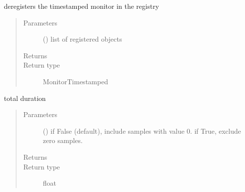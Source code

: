 \documentclass[letterpaper,10pt,english]{sphinxmanual}
\begin{document}
\begin{fulllineitems}
\begin{fulllineitems}
\end{fulllineitems}


\begin{fulllineitems}
\label{\detokenize{Reference:salabim.MonitorTimestamp.deregister}}
deregisters the timestamped monitor in the registry
\begin{quote}\begin{description}
\item[{Parameters}] \leavevmode
{} () \textendash{} list of registered objects

\item[{Returns}] \leavevmode
{}

\item[{Return type}] \leavevmode
MonitorTimestamped

\end{description}\end{quote}

\end{fulllineitems}


\begin{fulllineitems}
\label{\detokenize{Reference:salabim.MonitorTimestamp.duration}}
total duration
\begin{quote}\begin{description}
\item[{Parameters}] \leavevmode
{} () \textendash{} if False (default), include samples with value 0. if True, exclude zero samples.

\item[{Returns}] \leavevmode
{}

\item[{Return type}] \leavevmode
float

\end{description}\end{quote}

\end{fulllineitems}



\end{fulllineitems}
\end{document}
